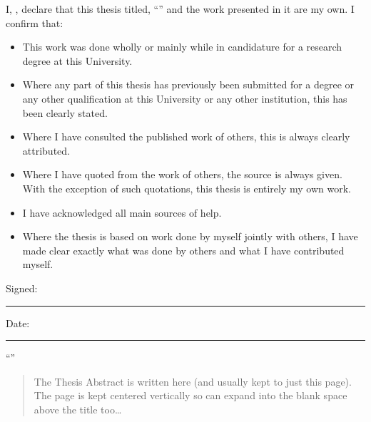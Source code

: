 \documentclass[11pt,english,singlespacing,headsepline,]{MastersDoctoralThesis}
\begin{document}
\begin{declaration}
\addchaptertocentry{\authorshipname} %
\noindent I, \authorname, declare that this thesis titled, \enquote{\ttitle} and the work presented in it are my own. I confirm that:

\begin{itemize} 
\item This work was done wholly or mainly while in candidature for a research degree at this University.
\item Where any part of this thesis has previously been submitted for a degree or any other qualification at this University or any other institution, this has been clearly stated.
\item Where I have consulted the published work of others, this is always clearly attributed.
\item Where I have quoted from the work of others, the source is always given. With the exception of such quotations, this thesis is entirely my own work.
\item I have acknowledged all main sources of help.
\item Where the thesis is based on work done by myself jointly with others, I have made clear exactly what was done by others and what I have contributed myself.\\
\end{itemize}
 
\noindent Signed:\\
\rule[0.5em]{25em}{0.5pt} %
 
\noindent Date:\\
\rule[0.5em]{25em}{0.5pt} %
\end{declaration}


\vspace*{0.2\textheight}

\noindent\enquote{\itshape}\bigbreak

\hfill


\begin{abstract}
\addchaptertocentry{\abstractname} %
The Thesis Abstract is written here (and usually kept to just this page). The page is kept centered vertically so can expand into the blank space above the title too\ldots
\end{abstract}
\end{document}
